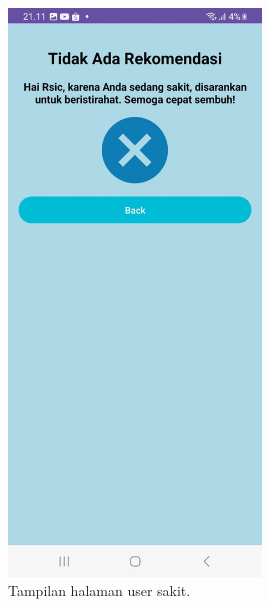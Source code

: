 \documentclass[journal,article,submit,pdftex,moreauthors]{Definitions/mdpi}
\begin{document}
\begin{figure}[H]
    \centering
    \includegraphics[width=0.6\textwidth]{Definitions/images/05.jpeg}
    \caption{Tampilan halaman user sakit.}
    \label{fig:daily-notifications}
\end{figure}
\end{document}
